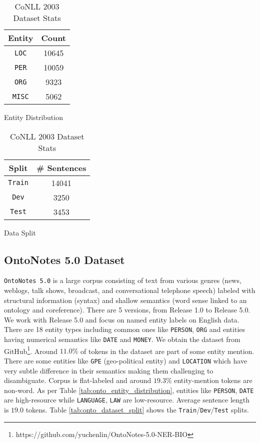 \begin{table}[h!]
\begin{subtable}[t]{.48\linewidth}
\centering
\begin{tabular}{|c|c|}\hline
	\textbf{Entity} & \textbf{Count}\\\hline
	\texttt{LOC} & 10645\\\hline
	\texttt{PER} & 10059\\\hline
	\texttt{ORG} & 9323\\\hline
	\texttt{MISC} & 5062\\\hline
	\end{tabular}
	\caption{Entity Distribution}
	\label{tab:conll_entity_distribution}
\end{subtable}
\begin{subtable}[t]{.48\linewidth}
\centering
\begin{tabular}{|c|c|}\hline
	\textbf{Split} & \textbf{\# Sentences}\\\hline
	\texttt{Train} & 14041\\\hline
	\texttt{Dev} & 3250\\\hline
	\texttt{Test} & 3453\\\hline
	\end{tabular}
	\caption{Data Split}
	\label{tab:conll_dataset_split}
\end{subtable}
\caption{CoNLL 2003 Dataset Stats}
\end{table}

\subsection{OntoNotes 5.0 Dataset}

\texttt{OntoNotes 5.0}\cite{weischedel2013ontonotes} is a large corpus consisting of text from various genres (news, weblogs, talk shows, broadcast, and conversational
telephone speech) labeled with structural information (syntax) and shallow semantics (word sense linked to an ontology and coreference). There are
5 versions, from Release 1.0 to Release 5.0. We work with Release 5.0 and focus on named entity labels on English data. There are 18 entity types including common ones like \texttt{PERSON}, \texttt{ORG} and entities having numerical semantics like \texttt{DATE} and \texttt{MONEY}. We obtain the dataset from GitHub\footnote{https://github.com/yuchenlin/OntoNotes-5.0-NER-BIO}. Around $11.0\%$ of tokens in the dataset are part of some entity mention. There are some entities like \texttt{GPE} (geo-political entity) and \texttt{LOCATION} which have very subtle difference in their semantics making them challenging to disambiguate. Corpus is flat-labeled and around $19.3\%$  entity-mention tokens are non-word. As per Table \ref{tab:onto_entity_distribution}, entities like \texttt{PERSON}, \texttt{DATE} are high-resource while \texttt{LANGUAGE}, \texttt{LAW} are low-resource. Average sentence length is $19.0$ tokens. Table \ref{tab:onto_dataset_split} shows the \texttt{Train}/\texttt{Dev}/\texttt{Test} splits. 

